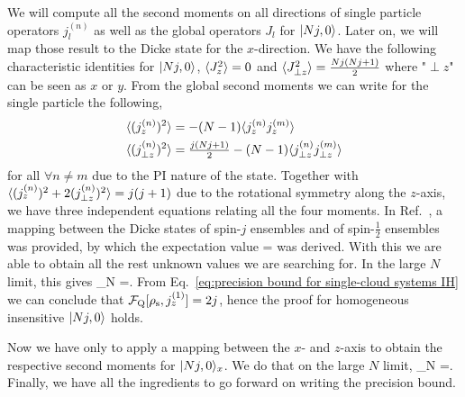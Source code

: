 We will compute all the second moments on all directions of single particle operators $j_l^{(n)}$ as well as the global operators $J_l$ for $\vert Nj,0 \rangle$.
Later on, we will map those result to the Dicke state for the $x$-direction.
We have the following characteristic identities for $\vert Nj,0 \rangle$, $\langle J_z^2 \rangle = 0$ and $\langle J_{\perp z}^2 \rangle = \frac{Nj(Nj+1)}{2}$ where "${\perp}{z}$" can be seen as $x$ or $y$.
From the global second moments we can write for the single particle the following,
\begin{align}
  \langle (j_z^{(n)})^2 \rangle &= -(N-1)\langle j_z^{(n)}j_z^{(m)} \rangle \\
  \langle (j_{\perp z}^{(n)})^2 \rangle &= \tfrac{j(Nj+1)}{2}-(N-1)\langle j_{\perp z}^{(n)}j_{\perp z}^{(m)} \rangle
\end{align}
for all $\forall n\neq m$ due to the PI nature of the state.
Together with $\langle (j_z^{(n)})^2+2(j_{\perp z}^{(n)})^2 \rangle = j(j+1)$ due to the rotational symmetry along the $z$-axis, we have three independent equations relating all the four moments.
In Ref.~\cite{Urizar-Lanz2013}, a mapping between the Dicke states of spin-$j$ ensembles and of spin-$\frac{1}{2}$ ensembles was provided, by which the expectation value
\be
  = 
\ee
was derived.
With this we are able to obtain all the rest unknown values we are searching for.
In the large $N$ limit, this gives
\be
\label{eq:jz2 for dicke state large number of particles}
\lim_{N \to \infty} =.
\ee
From Eq.~\eqref{eq:precision bound for single-cloud
systems IH} we can conclude that $\mathcal{F}_{\textnormal{Q}}[{\textstyle \rho_{\rm s},j_z^{(1)}}]=2j$,
hence the proof for homogeneous insensitive $\vert Nj,0 \rangle$ holds.

Now we have only to apply a mapping between the $x$- and $z$-axis to obtain the respective second moments for $\vert Nj,0 \rangle_{x}$.
We do that on the large $N$ limit,
\be
  \lim_{N \to \infty} =.
\ee
Finally, we have all the ingredients to go forward on writing the precision bound.

